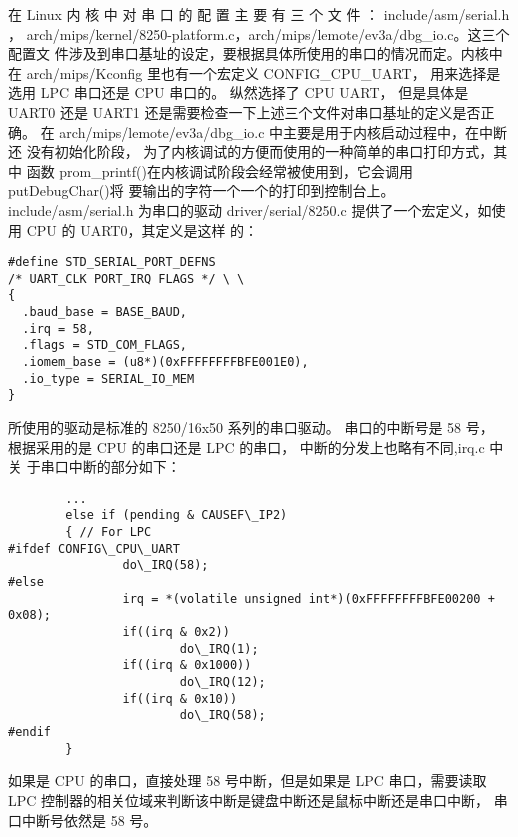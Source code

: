 在 Linux 内 核 中 对 串 口 的 配 置 主 要 有 三 个 文 件 ：
include/asm/serial.h ，
arch/mips/kernel/8250-platform.c，arch/mips/lemote/ev3a/dbg\_io.c。这三个配置文
件涉及到串口基址的设定，要根据具体所使用的串口的情况而定。内核中在
arch/mips/Kconfig 里也有一个宏定义 CONFIG\_CPU\_UART， 用来选择是选用 LPC
串口还是 CPU 串口的。 纵然选择了 CPU UART， 但是具体是 UART0 还是 UART1
还是需要检查一下上述三个文件对串口基址的定义是否正确。 在
arch/mips/lemote/ev3a/dbg\_io.c 中主要是用于内核启动过程中，在中断还
没有初始化阶段， 为了内核调试的方便而使用的一种简单的串口打印方式，其中 函数
prom\_printf()在内核调试阶段会经常被使用到，它会调用 putDebugChar()将
要输出的字符一个一个的打印到控制台上。include/asm/serial.h 为串口的驱动
driver/serial/8250.c 提供了一个宏定义，如使用 CPU 的 UART0，其定义是这样 的：

\begin{lstlisting}
#define STD_SERIAL_PORT_DEFNS
/* UART_CLK PORT_IRQ FLAGS */ \ \
{
  .baud_base = BASE_BAUD,
  .irq = 58,
  .flags = STD_COM_FLAGS,
  .iomem_base = (u8*)(0xFFFFFFFFBFE001E0),
  .io_type = SERIAL_IO_MEM
}
\end{lstlisting}

所使用的驱动是标准的 8250/16x50 系列的串口驱动。 串口的中断号是 58 号，
根据采用的是 CPU 的串口还是 LPC 的串口， 中断的分发上也略有不同,irq.c 中关
于串口中断的部分如下：

\begin{lstlisting}
        ...
        else if (pending & CAUSEF\_IP2)
        { // For LPC
#ifdef CONFIG\_CPU\_UART
                do\_IRQ(58);
#else
                irq = *(volatile unsigned int*)(0xFFFFFFFFBFE00200 + 0x08);
                if((irq & 0x2))
                        do\_IRQ(1);
                if((irq & 0x1000))
                        do\_IRQ(12);
                if((irq & 0x10))
                        do\_IRQ(58);
#endif
        }
\end{lstlisting}

如果是 CPU 的串口，直接处理 58 号中断，但是如果是 LPC 串口，需要读取 LPC
控制器的相关位域来判断该中断是键盘中断还是鼠标中断还是串口中断，
串口中断号依然是 58 号。

